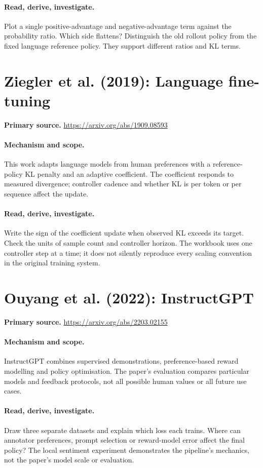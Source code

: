 \documentclass[11pt]{scrartcl}
\begin{document}
\paragraph{Read, derive, investigate.} Plot a single positive-advantage and negative-advantage term against the probability ratio. Which side flattens? Distinguish the old rollout policy from the fixed language reference policy. They support different ratios and KL terms.

\section{Ziegler et al. (2019): Language fine-tuning}
\noindent\textbf{Primary source.} \url{https://arxiv.org/abs/1909.08593}

\paragraph{Mechanism and scope.} This work adapts language models from human preferences with a reference-policy KL penalty and an adaptive coefficient. The coefficient responds to measured divergence; controller cadence and whether KL is per token or per sequence affect the update.

\paragraph{Read, derive, investigate.} Write the sign of the coefficient update when observed KL exceeds its target. Check the units of sample count and controller horizon. The workbook uses one controller step at a time; it does not silently reproduce every scaling convention in the original training system.

\section{Ouyang et al. (2022): InstructGPT}
\noindent\textbf{Primary source.} \url{https://arxiv.org/abs/2203.02155}

\paragraph{Mechanism and scope.} InstructGPT combines supervised demonstrations, preference-based reward modelling and policy optimisation. The paper's evaluation compares particular models and feedback protocols, not all possible human values or all future use cases.

\paragraph{Read, derive, investigate.} Draw three separate datasets and explain which loss each trains. Where can annotator preferences, prompt selection or reward-model error affect the final policy? The local sentiment experiment demonstrates the pipeline's mechanics, not the paper's model scale or evaluation.
\end{document}
